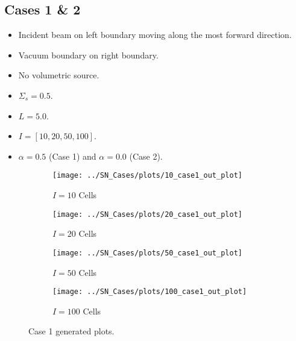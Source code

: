\documentclass{NE515}
\theoremstyle{definition}
\begin{document}
    \subsection{Cases 1 \& 2}
    \begin{itemize}
        \item Incident beam on left boundary moving along the most forward direction.
        \item Vacuum boundary on right boundary.
        \item No volumetric source.
        \item $\Sigma_s=0.5$.
        \item $L=5.0$.
        \item $I=[10,20,50,100]$.
        \item $\alpha=0.5$ (Case 1) and $\alpha=0.0$ (Case 2).
    \end{itemize}
    \begin{figure}
        \centering
        \begin{subfigure}{0.45\linewidth}
            \centering
            \texttt{[image: ../SN\_Cases/plots/10\_case1\_out\_plot]}
            \caption{$I=10$ Cells}
        \end{subfigure}
        \hfill
        \begin{subfigure}{0.45\linewidth}
            \centering
            \texttt{[image: ../SN\_Cases/plots/20\_case1\_out\_plot]}
            \caption{$I=20$ Cells}
        \end{subfigure}
        \hfill
        \begin{subfigure}{0.45\linewidth}
            \centering
            \texttt{[image: ../SN\_Cases/plots/50\_case1\_out\_plot]}
            \caption{$I=50$ Cells}
        \end{subfigure}
        \hfill
        \begin{subfigure}{0.45\linewidth}
            \centering
            \texttt{[image: ../SN\_Cases/plots/100\_case1\_out\_plot]}
            \caption{$I=100$ Cells}
        \end{subfigure}

        \caption{Case 1 generated plots.}
        \label{fig:case-1}
    \end{figure}
    \clearpage
\end{document}
